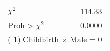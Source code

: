 \begin{tabular}{lr}
\toprule
$\chi^2$ &    114.33 \\
Prob > $\chi^2$ &    0.0000 \\
\bottomrule
\multicolumn{2}{l}{\footnotesize ( 1) Childbirth $\times$ Male = 0}\\
\end{tabular}
